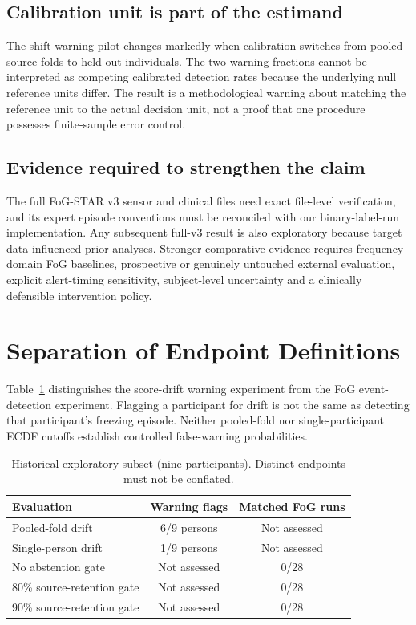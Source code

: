 \documentclass[sigconf,review,anonymous]{acmart}
\begin{document}
\subsection{Calibration unit is part of the estimand}
The shift-warning pilot changes markedly when calibration switches from pooled source folds to held-out individuals. The two warning fractions cannot be interpreted as competing calibrated detection rates because the underlying null reference units differ. The result is a methodological warning about matching the reference unit to the actual decision unit, not a proof that one procedure possesses finite-sample error control.

\subsection{Evidence required to strengthen the claim}
The full FoG-STAR v3 sensor and clinical files need exact file-level verification, and its expert episode conventions must be reconciled with our binary-label-run implementation. Any subsequent full-v3 result is also exploratory because target data influenced prior analyses. Stronger comparative evidence requires frequency-domain FoG baselines, prospective or genuinely untouched external evaluation, explicit alert-timing sensitivity, subject-level uncertainty and a clinically defensible intervention policy.

\section{Separation of Endpoint Definitions}
Table~\ref{tab:warningaudit} distinguishes the score-drift warning experiment from the FoG event-detection experiment. Flagging a participant for drift is not the same as detecting that participant's freezing episode. Neither pooled-fold nor single-participant ECDF cutoffs establish controlled false-warning probabilities.

\begin{table}[t]
\caption{Historical exploratory subset (nine participants). Distinct endpoints must not be conflated.}
\label{tab:warningaudit}
\centering
\begin{tabular}{lcc}
\toprule
Evaluation & Warning flags & Matched FoG runs\\
\midrule
Pooled-fold drift & 6/9 persons & Not assessed\\
Single-person drift & 1/9 persons & Not assessed\\
No abstention gate & Not assessed & 0/28\\
80\% source-retention gate & Not assessed & 0/28\\
90\% source-retention gate & Not assessed & 0/28\\
\bottomrule
\end{tabular}
\end{table}
\end{document}
